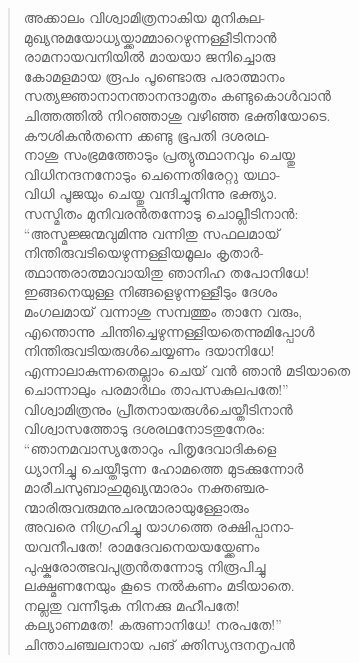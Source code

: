 \begin{verse}
അക്കാലം വിശ്വാമിത്രനാകിയ മുനികുല-\\
മുഖ്യനുമയോധ്യയ്ക്കാമ്മാറെഴുന്നള്ളീടിനാന്‍\\
രാമനായവനിയില്‍ മായയാ ജനിച്ചൊരു\\
കോമളമായ രൂപം പൂണ്ടൊരു പരാത്മാനം\\
സത്യജ്ഞാനാനന്താനന്ദാമൃതം കണ്ടുകൊള്‍വാന്‍\\
ചിത്തത്തില്‍ നിറഞ്ഞാശു വഴിഞ്ഞ ഭക്തിയോടെ.\\
കൗശികന്‍തന്നെ ക്കണ്ടു ഭൂപതി ദശരഥ-\\
നാശു സംഭ്രമത്തോടും പ്രത്യുത്ഥാനവും ചെയ്തു\\
വിധിനന്ദനനോടും ചെന്നെതിരേറ്റു യഥാ-\\
വിധി പൂജയും ചെയ്തു വന്ദിച്ചുനിന്നു ഭക്ത്യാ.\\
സസ്മിതം മുനിവരന്‍തന്നോടു ചൊല്ലീടിനാന്‍:\\
“അസ്മജ്ജന്മവുമിന്നു വന്നിതു സഫലമായ്\\
നിന്തിരുവടിയെഴുന്നള്ളിയമൂലം കൃതാര്‍-\\
ത്ഥാന്തരാത്മാവായിതു ഞാനിഹ തപോനിധേ!\\
ഇങ്ങനെയുള്ള നിങ്ങളെഴുന്നള്ളീടും ദേശം\\
മംഗലമായ് വന്നാശു സമ്പത്തും താനേ വരും,\\
എന്തൊന്നു ചിന്തിച്ചെഴുന്നള്ളിയതെന്നുമിപ്പോള്‍\\
നിന്തിരുവടിയരുള്‍ചെയ്യണം ദയാനിധേ!\\
എന്നാലാകുന്നതെല്ലാം ചെയ് വന്‍ ഞാന്‍ മടിയാതെ\\
ചൊന്നാലും പരമാര്‍ഥം താപസകുലപതേ!”\\
വിശ്വാമിത്രനും പ്രീതനായരുള്‍ചെയ്തീടിനാന്‍\\
വിശ്വാസത്തോടു ദശരഥനോടതുനേരം:\\
“ഞാനമവാസ്യതോറും പിതൃദേവാദികളെ\\
ധ്യാനിച്ചു ചെയ്തീടുന്ന ഹോമത്തെ മുടക്കുന്നോര്‍\\
മാരീചസുബാഹുമുഖ്യന്മാരാം നക്തഞ്ചര-\\
ന്മാരിരുവരുമനുചരന്മാരായുള്ളോരും\\
അവരെ നിഗ്രഹിച്ചു യാഗത്തെ രക്ഷിപ്പാനാ-\\
യവനീപതേ! രാമദേവനെയയയ്ക്കേണം\\
പുഷ്കരോത്ഭവപുത്രന്‍തന്നോടു നിരൂപിച്ചു\\
ലക്ഷ്മണനേയും കൂടെ നല്‍കണം മടിയാതെ.\\
നല്ലതു വന്നീടുക നിനക്കു മഹീപതേ!\\
കല്യാണമതേ! കരുണാനിധേ! നരപതേ!”\\
ചിന്താചഞ്ചലനായ പങ് ക്തിസ്യന്ദനനൃപന്‍\\

\end{verse}
